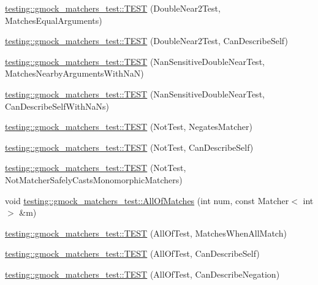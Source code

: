 \begin{DoxyCompactItemize}
\mbox{\hyperlink{namespacetesting_1_1gmock__matchers__test_aa7589c5d34e5aae4031e5e0fac29c9f5}{testing\+::gmock\+\_\+matchers\+\_\+test\+::\+T\+E\+ST}} (Double\+Near2\+Test, Matches\+Equal\+Arguments)
\item 
\mbox{\hyperlink{namespacetesting_1_1gmock__matchers__test_a6f3834a4f5028027db270e7f3e0052f6}{testing\+::gmock\+\_\+matchers\+\_\+test\+::\+T\+E\+ST}} (Double\+Near2\+Test, Can\+Describe\+Self)
\item 
\mbox{\hyperlink{namespacetesting_1_1gmock__matchers__test_a29c16f71a512c1f7906f54167c6bd6ab}{testing\+::gmock\+\_\+matchers\+\_\+test\+::\+T\+E\+ST}} (Nan\+Sensitive\+Double\+Near\+Test, Matches\+Nearby\+Arguments\+With\+NaN)
\item 
\mbox{\hyperlink{namespacetesting_1_1gmock__matchers__test_a873b74c264015e8e2bb1a1f693f4cf88}{testing\+::gmock\+\_\+matchers\+\_\+test\+::\+T\+E\+ST}} (Nan\+Sensitive\+Double\+Near\+Test, Can\+Describe\+Self\+With\+Na\+Ns)
\item 
\mbox{\hyperlink{namespacetesting_1_1gmock__matchers__test_ab41b57eeaea5568064b6ed3725316c73}{testing\+::gmock\+\_\+matchers\+\_\+test\+::\+T\+E\+ST}} (Not\+Test, Negates\+Matcher)
\item 
\mbox{\hyperlink{namespacetesting_1_1gmock__matchers__test_a831db2bf90c3950953cdceaefebddd40}{testing\+::gmock\+\_\+matchers\+\_\+test\+::\+T\+E\+ST}} (Not\+Test, Can\+Describe\+Self)
\item 
\mbox{\hyperlink{namespacetesting_1_1gmock__matchers__test_a46849e0c019e331f830ed91137fa417a}{testing\+::gmock\+\_\+matchers\+\_\+test\+::\+T\+E\+ST}} (Not\+Test, Not\+Matcher\+Safely\+Casts\+Monomorphic\+Matchers)
\item 
void \mbox{\hyperlink{namespacetesting_1_1gmock__matchers__test_a51d8731c3824a6acdaa594645dd46779}{testing\+::gmock\+\_\+matchers\+\_\+test\+::\+All\+Of\+Matches}} (int num, const Matcher$<$ int $>$ \&m)
\item 
\mbox{\hyperlink{namespacetesting_1_1gmock__matchers__test_a7714d041eb2dd2e233db7f175fedef5a}{testing\+::gmock\+\_\+matchers\+\_\+test\+::\+T\+E\+ST}} (All\+Of\+Test, Matches\+When\+All\+Match)
\item 
\mbox{\hyperlink{namespacetesting_1_1gmock__matchers__test_a31056975d89eea2786997cf18b086bf4}{testing\+::gmock\+\_\+matchers\+\_\+test\+::\+T\+E\+ST}} (All\+Of\+Test, Can\+Describe\+Self)
\item 
\mbox{\hyperlink{namespacetesting_1_1gmock__matchers__test_a86c15b3bc163321c7a56aeb0b1709b87}{testing\+::gmock\+\_\+matchers\+\_\+test\+::\+T\+E\+ST}} (All\+Of\+Test, Can\+Describe\+Negation)

\end{DoxyCompactItemize}
